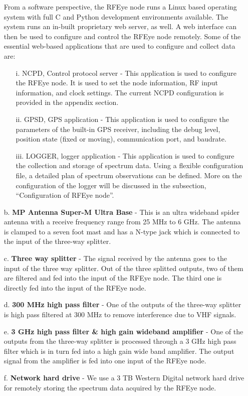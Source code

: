 \documentclass[12pt,sts]{report}
\begin{document}
\begin{enumerate}
	From a software perspective, the RFEye node runs a Linux based operating system with full C and Python development environments available. The system runs an in-built proprietary web server, as well. A web interface can then be used to configure and control the RFEye node remotely.
	Some of the essential web-based applications that are used to configure and collect data are:
	\begin{enumerate}
		\item[i.] NCPD, Control protocol server - This application is used to configure the RFEye node. It is used to set the node information, RF input information, and clock settings. The current NCPD configuration is provided in the appendix section.
		\item[ii.] GPSD, GPS application - This application is used to configure the parameters of the built-in GPS receiver, including the debug level, position state (fixed or moving), communication port, and baudrate.
		\item[iii.] LOGGER, logger application - This application is used to configure the collection and storage of spectrum data. Using a flexible configuration file, a detailed plan of spectrum observations can be defined. More on the configuration of the logger will be discussed in the subsection, ``Configuration of RFEye node''.
	\end{enumerate}
	
	\item[b.] \textbf{MP Antenna Super-M Ultra Base} - This is an ultra wideband spider antenna with a receive frequency range from 25 MHz to 6 GHz. The antenna is clamped to a seven foot mast and has a N-type jack which is connected to the input of the three-way splitter.
	\item[c.] \textbf{Three way splitter} - The signal received by the antenna goes to the input of the three way splitter. Out of the three splitted outputs, two of them are filtered and fed into the input of the RFEye node. The third one is directly fed into the input of the RFEye node. 
	\item[d.] \textbf{300 MHz high pass filter} - One of the outputs of the three-way splitter is high pass filtered at 300 MHz to remove interference due to VHF signals.
	\item[e.] \textbf{3 GHz high pass filter \& high gain wideband amplifier} - One of the outputs from the three-way splitter is processed through a 3 GHz high pass filter which is in turn fed into a high gain wide band amplifier. The output signal from the amplifier is fed into one input of the RFEye node.
	\item[f.] \textbf{Network hard drive} - We use a 3 TB Western Digital network hard drive for remotely storing the spectrum data acquired by the RFEye node.
\end{enumerate}
\end{document}
